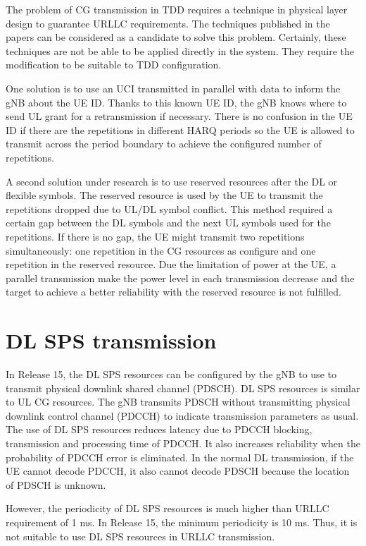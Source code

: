 \documentclass{report}
\begin{document}
The problem of CG transmission in TDD requires a technique in physical layer design to guarantee URLLC requirements. The techniques published in the papers can be considered as a candidate to solve this problem. Certainly, these techniques are not be able to be applied directly in the system. They require the modification to be suitable to TDD configuration.

One solution is to use an UCI transmitted in parallel with data to inform the gNB about the UE ID. Thanks to this known UE ID, the gNB knows where to send UL grant for a retransmission if necessary. There is no confusion in the UE ID if there are the repetitions in different HARQ periods so the UE is allowed to transmit across the period boundary to achieve the configured number of repetitions.

A second solution under research is to use reserved resources after the DL or flexible symbols. The reserved resource is used by the UE to transmit the repetitions dropped due to UL/DL symbol conflict. This method required a certain gap between the DL symbols and the next UL symbols used for the repetitions. If there is no gap, the UE might transmit two repetitions simultaneously: one repetition in the CG resources as configure and one repetition in the reserved resource. Due the limitation of power at the UE, a parallel transmission make the power level in each transmission decrease and the target to achieve a better reliability with the reserved resource is not fulfilled.

\section{ DL SPS transmission}

In Release 15, the DL SPS resources can be configured by the gNB to use to transmit physical downlink shared channel (PDSCH). DL SPS resources is similar to UL CG resources. The gNB transmits PDSCH without transmitting physical downlink control channel (PDCCH) to indicate transmission parameters as usual. The use of DL SPS resources reduces latency due to PDCCH blocking, transmission and processing time of PDCCH. It also increases reliability when the probability of PDCCH error is eliminated. In the normal DL transmission, if the UE cannot decode PDCCH, it also cannot decode PDSCH because the location of PDSCH is unknown. 

However, the periodicity of DL SPS resources is much higher than URLLC requirement of 1 ms. In Release 15, the minimum periodicity is 10 ms. Thus, it is not suitable to use DL SPS resources in URLLC transmission.
\end{document}
